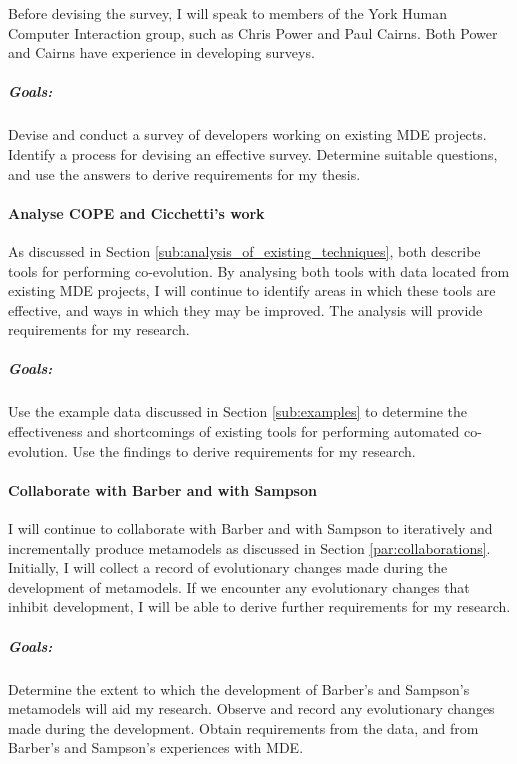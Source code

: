 Before devising the survey, I will speak to members of the York Human Computer Interaction group, such as Chris Power and Paul Cairns. Both Power and Cairns have experience in developing surveys.

\subparagraph{Goals:} Devise and conduct a survey of developers working on existing MDE projects. Identify a process for devising an effective survey. Determine suitable questions, and use the answers to derive requirements for my thesis.



\paragraph{Analyse COPE and Cicchetti's work} %
\label{par:analyse_existing_work}
As discussed in Section \ref{sub:analysis_of_existing_techniques}, \cite{herrmannsdoerfer08cope,cicchetti08automating} both describe tools for performing co-evolution. By analysing both tools with data located from existing MDE projects, I will continue to identify areas in which these tools are effective, and ways in which they may be improved. The analysis will provide requirements for my research.

\subparagraph{Goals:} Use the example data discussed in Section \ref{sub:examples} to determine the effectiveness and shortcomings of existing tools for performing automated co-evolution. Use the findings to derive requirements for my research.



\paragraph{Collaborate with Barber and with Sampson} %
\label{par:collaborate_with_barber_and_with_sampson}
I will continue to collaborate with Barber and with Sampson to iteratively and incrementally produce metamodels as discussed in Section \ref{par:collaborations}. Initially, I will collect a record of evolutionary changes made during the development of metamodels. If we encounter any evolutionary changes that inhibit development, I will be able to derive further requirements for my research.

\subparagraph{Goals:} Determine the extent to which the development of Barber's and Sampson's metamodels will aid my research. Observe and record any evolutionary changes made during the development. Obtain requirements from the data, and from Barber's and Sampson's experiences with MDE.

